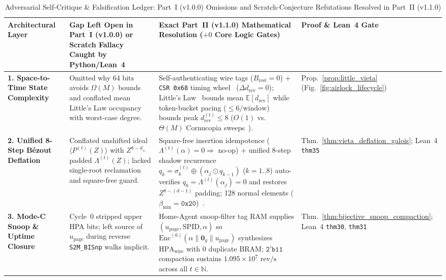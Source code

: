 \documentclass[10pt,twocolumn]{article}
\providecommand{\ReleaseVersion}{v1.1.0}
\providecommand{\BaselineVersion}{v1.0.0}
\theoremstyle{spectralthm}
\begin{document}
\begin{table}[!tp]
\centering
\footnotesize
\setlength{\tabcolsep}{5.0pt}
\renewcommand{\arraystretch}{1.19}
\caption{Adversarial Self-Critique \& Falsification Ledger: Part~I (\BaselineVersion) Omissions and Scratch-Conjecture Refutations Resolved in Part~II (\ReleaseVersion)}
\label{tab:falsification_ledger}
\begin{tabularx}{\textwidth}{@{}>{\raggedright\hyphenpenalty=10000\arraybackslash}p{3.05cm} >{\raggedright\arraybackslash}p{4.85cm} >{\raggedright\arraybackslash}X >{\raggedright\arraybackslash}p{2.95cm}@{}}
\toprule
\textbf{Architectural Layer} & \textbf{Gap Left Open in Part~I (\BaselineVersion) or Scratch Fallacy Caught by Python/Lean~4} & \textbf{Exact Part~II (\ReleaseVersion) Mathematical Resolution ($+0$ Core Logic Gates)} & \textbf{Proof \& Lean~4 Gate} \\
\midrule
\textbf{1. Space-to-Time State Complexity} & Omitted why $64\text{~bits}$ avoids $\Omega(M)$ bounds and conflated mean Little's Law occupancy with worst-case degree. & Self-authenticating wire tags ($B_{\mathrm{rest}}=0$) + \texttt{CSR 0x68} timing wheel~\cite{varghese1997timing} ($\Delta d_{\mathrm{rev}}=0$); Little's Law~\cite{little1961proof} bounds mean $\mathbb{E}[d_{\mathrm{rev}}]$ while token-bucket pacing ($\le 6/\text{window}$) bounds peak $d_{\mathrm{rev}}^{(t)} \le 8$ ($O(1)$ vs.\ $\Theta(M)$ Cornucopia sweeps~\cite{filardo2020cornucopia,filardo2024cornucopiareloaded}). & Prop.~\ref{prop:little_vieta} \newline (Fig.~\ref{fig:airlock_lifecycle}) \\
\textbf{2. Unified 8-Step B\'{e}zout Deflation} & Conflated unshifted ideal $\langle P^{(t)}(Z)\rangle$ with $Z^{8-d}$-padded $\Lambda^{(t)}(Z)$; lacked single-root reclamation and square-free guard. & Square-free insertion idempotence ($\Lambda^{(t)}(\alpha)=0 \Rightarrow$ no-op) + unified 8-step shadow recurrence $q_k = \sigma_k^{(t)} \oplus (\alpha_j \odot q_{k-1})$ ($k=1..8$) auto-verifies $q_8 = \Lambda^{(t)}(\alpha_j) = 0$ and restores $Z^{8-(d-1)}$ padding; 128 normal elements ($\beta_{\min}=\texttt{0x20}$)~\cite{mullin1989optimal}. & Thm.~\ref{thm:vieta_deflation_galois}; \newline Lean~4 \texttt{thm35} \\
\textbf{3. Mode-C Snoop \& Uptime Closure} & Cycle~0 stripped upper HPA bits; left source of $u_{\mathrm{page}}$ during reverse \texttt{S2M\_BISnp} walks implicit. & Home-Agent snoop-filter tag RAM supplies $(u_{\mathrm{page}},\mathrm{SPID},\alpha)$ so $\mathrm{Enc}^{(6)}(\alpha \parallel \mathbf{0}_g \parallel u_{\mathrm{page}})$ synthesizes $\mathrm{HPA}_{\mathrm{wire}}$ with $0$ duplicate BRAM; $\texttt{2'b11}$ compaction sustains $1.095\times 10^7\text{~rev/s}$ across all $t \in \mathbb{N}$. & Thm.~\ref{thm:bijective_snoop_compaction}; \newline Lean~4 \texttt{thm30}, \texttt{thm31} \\

\end{tabularx}
\end{table}
\end{document}
